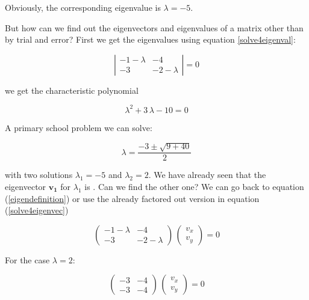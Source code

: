\documentclass{tufte-book} %
\begin{document}
Obviously, the corresponding eigenvalue is $\lambda=-5$.

But how can we find out the eigenvectors and eigenvalues of a matrix other than by trial and error? First we get the eigenvalues using equation \ref{solve4eigenval}:

\begin{equation}
  \left|\begin{matrix} -1-\lambda & -4\\ -3 & -2-\lambda\end{matrix} \right| = 0 \nonumber
\end{equation}

we get the characteristic polynomial

\begin{equation}
	\lambda^2  +3 \,  \lambda  - 10 = 0 \nonumber
\end{equation}

A primary school problem we can solve:

\begin{equation}
	\lambda= \frac{-3 \pm \sqrt{9+40}}{2} \nonumber
\end{equation}

with two solutions $\lambda_1=-5$ and $\lambda_2=2$. We have already seen that the eigenvector $\mathbf{v_1}$ for $\lambda_1$ is . Can we find the other one? We can go back to equation (\ref{eigendefinition}) or use the already factored out version in equation  (\ref{solve4eigenvec})

\begin{equation}
\begin{pmatrix} -1-\lambda & -4\\ -3 & -2-\lambda\end{pmatrix} \, \begin{pmatrix} v_x \\  v_y\end{pmatrix} = 0 \nonumber
\end{equation}

For the case $\lambda = 2$:

\begin{equation}
	\begin{pmatrix} -3 & -4\\ -3 & -4\end{pmatrix} \, \begin{pmatrix} v_x \\  v_y\end{pmatrix} = 0 \nonumber
\end{equation}
\end{document}
